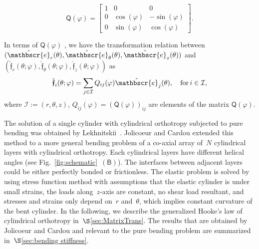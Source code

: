\documentclass[preprint,10pt,times]{elsarticle}
\numberwithin{equation}{section}
\newcommand{\physe}{\hat{\mathbscr{e}}} %
\newcommand{\physf}{\hat{\boldsymbol{\mathfrak{f}}}}
\renewcommand{\u}[1]{\boldsymbol{#1}}
\newcommand{\usf}[1]{\u{\mathsf #1}}
\newcommand{\pr}[1]{\left( #1 \right)}
\newcommand{\subf}[1]{\pr{\textsf{#1}}}
\renewcommand{\>}{$\Rightarrow$}
\begin{document}
\begin{equation}
\usf{Q}(\varphi)
= \begin{bmatrix}
1 & 0 & 0 \\
 0 & \cos(\varphi) & -\sin(\varphi) \\
 0 & \sin(\varphi) & \cos(\varphi)
 \end{bmatrix}.
\end{equation}

In terms of $\usf{Q}(\varphi)$ , we have the transformation relation between~$(\physe_{r}(\theta),\physe_{\theta}(\theta),\physe_{z}(\theta))$ and~$\pr{\physf_{r}(\theta;\varphi),\physf_{\theta}(\theta;\varphi),\physf_{z}(\theta;\varphi)}$ as
\begin{equation}
\physf_{i} (\theta;\varphi) = \sum_{j \in \mathcal{I} } Q_{ij}(\varphi)\physe_{j}(\theta), \quad \text{for} \,i \in \mathcal{I} ,
\label{eq:Qtransform}
\end{equation}
where $\mathcal{I} :=\pr{r,\theta,z}$,  $Q_{ij}(\varphi) = \pr{\usf{Q}(\varphi)}_{ij}$ are elements of the matrix $\usf{Q}(\varphi)$.


The solution of a single cylinder with cylindrical orthotropy subjected to pure bending was obtained by Lekhnitskii~\cite{Lekhnitskii1981}. Jolicoeur and Cardou extended this method to a more general bending problem of a co-axial array of~$N$ cylindrical layers with cylindrical orthotropy. Each cylindrical layers have different helical angles (see Fig.~\ref{fig:schematic}~$\subf{B}$). The interfaces between adjacent layers could be either perfectly bonded or frictionless. The elastic problem is solved by using stress function method with assumptions that the elastic cylinder is under small strains, the loads along~$z$-axis are constant, no shear load resultant, and stresses and strains only depend on~$r$ and~$\theta$, which implies constant curvature of the bent cylinder. In the following, we describe the generalized Hooke's law of cylindrical orthotropy in~$\S$\ref{sec:MatrixTrans}. The results that are obtained by Jolicoeur and Cardou and relevant to the pure bending problem are summarized in~$\S$\ref{sec:bending stiffness}.
\end{document}
